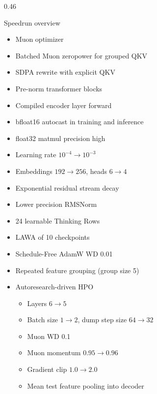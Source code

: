 \documentclass[final]{beamer}
\begin{document}
\begin{frame}[t]
\begin{columns}[t]
\begin{column}{0.46\paperwidth}
\begin{block}{Speedrun overview}
    \begin{minipage}[t]{0.49\linewidth}
      \begin{itemize}
        \item Muon optimizer \cite{jordan2024muon}
        \item Batched Muon zeropower for grouped QKV
        \item SDPA rewrite with explicit QKV
        \item Pre-norm transformer blocks \cite{geiping2023cramming}
        \item Compiled encoder layer forward
        \item bfloat16 autocast in training and inference
        \item float32 matmul precision high
        \item Learning rate $10^{-4} \rightarrow 10^{-3}$
        \item Embeddings $192 \rightarrow 256$, heads $6 \rightarrow 4$
        \item Exponential residual stream decay
      \end{itemize}
    \end{minipage}\hfill
    \begin{minipage}[t]{0.49\linewidth}
      \begin{itemize}
        \item Lower precision RMSNorm \cite{zhang2019rmsnorm}
        \item 24 learnable Thinking Rows \cite{grinsztajn2026tabpfn25advancingstateart}
        \item LAWA of 10 checkpoints \cite{kaddour2022lawa, sanyal2024early}
        \item Schedule-Free AdamW WD 0.01 \cite{defazio2024schedulefree}
        \item Repeated feature grouping (group size 5) \cite{qu2026tabiclv2}
        \item Autoresearch-driven HPO \cite{karpathy2026autoresearch}
        \begin{itemize}
          \item Layers $6 \rightarrow 5$
          \item Batch size $1 \rightarrow 2$, dump step size $64 \rightarrow 32$
          \item Muon WD 0.1
          \item Muon momentum $0.95 \rightarrow 0.96$
          \item Gradient clip $1.0 \rightarrow 2.0$
          \item Mean test feature pooling into decoder
        \end{itemize}
      \end{itemize}
    \end{minipage}


\end{block}
\end{column}
\end{columns}
\end{frame}
\end{document}
